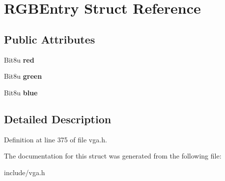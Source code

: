 \hypertarget{structRGBEntry}{\section{R\-G\-B\-Entry Struct Reference}
\label{structRGBEntry}
}
\subsection*{Public Attributes}
\begin{DoxyCompactItemize}
\item 
\hypertarget{structRGBEntry_a51c517e90d0d1bab872e5fdee34a60bc}{Bit8u {\bfseries red}}\label{structRGBEntry_a51c517e90d0d1bab872e5fdee34a60bc}

\item 
\hypertarget{structRGBEntry_adc6713003c2ad77cc873d56e74135362}{Bit8u {\bfseries green}}\label{structRGBEntry_adc6713003c2ad77cc873d56e74135362}

\item 
\hypertarget{structRGBEntry_a96944c8a46f4ae70ec99e8e33d117627}{Bit8u {\bfseries blue}}\label{structRGBEntry_a96944c8a46f4ae70ec99e8e33d117627}

\end{DoxyCompactItemize}


\subsection{Detailed Description}


Definition at line 375 of file vga.\-h.



The documentation for this struct was generated from the following file\-:\begin{DoxyCompactItemize}
\item 
include/vga.\-h\end{DoxyCompactItemize}
